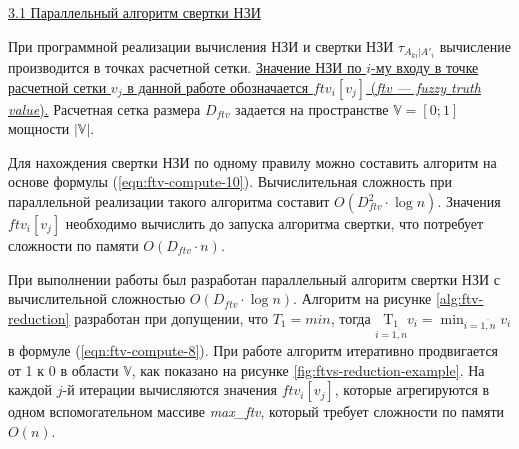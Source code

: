 




\ul{3.1 Параллельный алгоритм свертки НЗИ}

При программной реализации вычисления НЗИ и свертки НЗИ $\tau_{A_{ki}|A'_i}$ вычисление производится в точках расчетной сетки. \ul{Значение НЗИ по $i$-му входу в точке расчетной сетки $v_j$ в данной работе обозначается $ftv_i[v_j]$ (\textit{ftv --- fuzzy truth value}).} Расчетная сетка размера $D_{ftv}$ задается на пространстве $\mathbb{V}=[0;1]$ мощности $|\mathbb{V}|$.

Для нахождения свертки НЗИ по одному правилу можно составить алгоритм на основе формулы (\ref{eqn:ftv-compute-10}). Вычислительная сложность при параллельной реализации такого алгоритма составит $O\left(D_{ftv}^2 \cdot \log{n}\right)$. Значения $ftv_i[v_j]$ необходимо вычислить до запуска алгоритма свертки, что потребует сложности по памяти $O\left(D_{ftv}\cdot n\right)$.

При выполнении работы был разработан параллельный алгоритм свертки НЗИ \cite{Karatach2023b} с вычислительной сложностью $O\left(D_{ftv}\cdot \log{n}\right)$. Алгоритм на рисунке \ref{alg:ftv-reduction} разработан при допущении, что $T_1 = min$, тогда $\underset{i=\overline{1,n}}{\mathrm{T_1}}v_i = \min_{i=\overline{1,n}} v_i$ в формуле (\ref{eqn:ftv-compute-8}). При работе алгоритм итеративно продвигается от 1 к 0 в области $\mathbb{V}$, как показано на рисунке \cref{fig:ftvs-reduction-example}. На каждой $j$-й итерации вычисляются значения $ftv_i[v_j]$, которые агрегируются в одном вспомогательном массиве \textit{max\_ftv}, который требует сложности по памяти $O\left(n\right)$.

